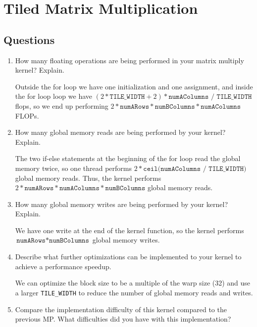 \documentclass[../main.tex]{subfiles}
\begin{document}
\pagestyle{fancy}


\renewcommand{\thefigure}{\arabic{figure}}
\section*{Tiled Matrix Multiplication}

\subsection*{Questions}

\begin{enumerate}
    \item How many floating operations are being performed in your matrix multiply
    kernel? Explain.
    
    Outside the for loop we have one initialization and one assignment, and inside the for loop
    loop we have $(2 * \texttt{TILE\_WIDTH} + 2) * \texttt{numAColumns / TILE\_WIDTH}$ flops, so
    we end up performing $2 * \texttt{numARows} * \texttt{numBColumns} * \texttt{numAColumns}$
    FLOPs. 

    \item How many global memory reads are being performed by your kernel?
    Explain.

    The two if-else statements at the beginning of the for loop read the global memory
    twice, so one thread performs $2 * \texttt{ceil(numAColumns / TILE\_WIDTH)}$ global memory
    reads. Thus, the kernel performs
    $2 * \texttt{numARows} * \texttt{numAColumns} * \texttt{numBColumns}$ global memory reads.

    
    \item How many global memory writes are being performed by your kernel?
    Explain.

    We have one write at the end of the kernel function, so the kernel performs
    $\texttt{numARows} * \texttt{numBColumns}$ global memory writes.
    
    \item Describe what further optimizations can be implemented to your kernel to
    achieve a performance speedup.

    We can optimize the block size to be a multiple of the warp size (32) and use
    a larger \texttt{TILE\_WIDTH} to reduce the number of global memory reads and writes.
    
    \item Compare the implementation diﬃculty of this kernel compared to the
    previous MP. What diﬃculties did you have with this implementation?


\end{enumerate}
\end{document}
